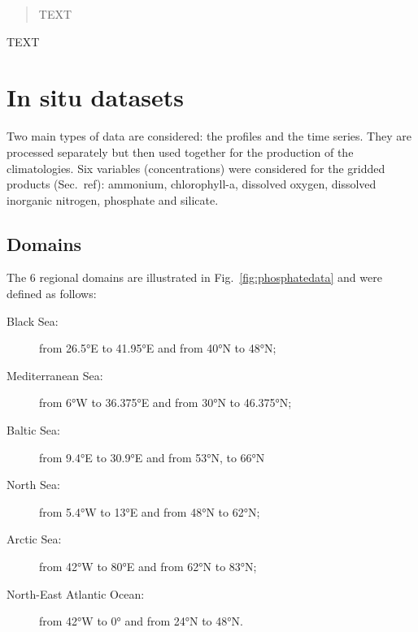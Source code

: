 \documentclass[essd, manuscript]{copernicus}
\begin{document}

\maketitle



\begin{abstract}
TEXT
\end{abstract}


\introduction  %
TEXT


\section{In situ datasets\label{sec:insitu}}
Two main types of data are considered: the profiles and the time series. They are processed separately but then used together for the production of the climatologies. Six variables (concentrations) were considered for the gridded products (Sec.~ref{}): ammonium, chlorophyll-a, dissolved oxygen, dissolved inorganic nitrogen, phosphate and silicate.





\subsection{Domains}
The 6 regional domains are illustrated in Fig.~\ref{fig:phosphatedata} and were defined as follows:
\begin{description}
\item[Black Sea:] from 26.5°E to 41.95°E and from 40°N to 48°N;
\item[Mediterranean Sea:] from 6°W to 36.375°E and from 30°N to 46.375°N;
\item[Baltic Sea:] from 9.4°E to 30.9°E and from 53°N, to 66°N
\item[North Sea:] from 5.4°W to 13°E and from 48°N to 62°N;
\item[Arctic Sea:] from 42°W to 80°E and from 62°N to 83°N;
\item[North-East Atlantic Ocean:] from 42°W to 0° and from 24°N to 48°N.
\end{description}
\end{document}
